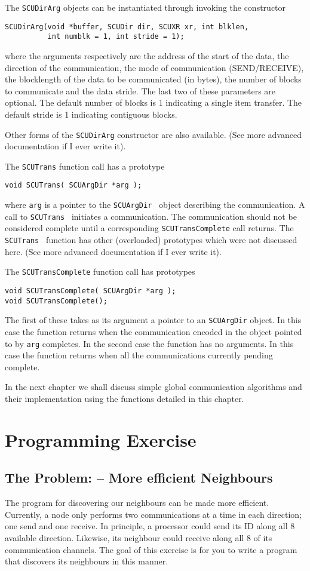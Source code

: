 The {\tt SCUDirArg} objects can be instantiated through invoking the 
constructor
\begin{verbatim}
SCUDirArg(void *buffer, SCUDir dir, SCUXR xr, int blklen, 
          int numblk = 1, int stride = 1);
\end{verbatim} 
where the arguments respectively are the address of the start of the
data, the direction of the communication, the mode of communication
(SEND/RECEIVE), the blocklength of the data to be communicated (in
bytes), the number of blocks to communicate and the data stride. The
last two of these parameters are optional. The default number of blocks
is 1 indicating a single item transfer. The default stride is 1 indicating
contiguous blocks.

Other forms of the {\tt SCUDirArg} constructor are also available.
(See more advanced documentation if I ever write it).

The {\tt SCUTrans} function call has a prototype
\begin{verbatim}
void SCUTrans( SCUArgDir *arg );
\end{verbatim}
where {\tt arg} is a pointer to the {\tt SCUArgDir } object describing
the communication. A call to {\tt SCUTrans } initiates a communication.
The communication should not be considered complete until a corresponding
{\tt SCUTransComplete} call returns. The {\tt SCUTrans } function has
other (overloaded) prototypes which were not discussed here. (See more
advanced documentation if I ever write it).

The {\tt SCUTransComplete} function call has prototypes
\begin{verbatim}
void SCUTransComplete( SCUArgDir *arg );
void SCUTransComplete();
\end{verbatim}
The first of these takes as its argument a pointer to an {\tt SCUArgDir} object.
In this case the function returns when the communication encoded in the
object pointed to by {\tt arg} completes. In the second case the function
has no arguments. In this case the function returns when all the 
communications currently pending complete.

In the next chapter we shall discuss simple global communication algorithms
and their implementation using the functions detailed in this chapter.

\section{Programming Exercise}
\subsection{The Problem: -- More efficient Neighbours}
The program for discovering our neighbours can be made more efficient. Currently, a node only performs two communications at a time in each direction; one send and one receive. In principle, a processor could send its ID along all 8
available direction. Likewise, its neighbour could receive along all 8 of its
communication channels. The goal of this exercise is for you to write a
program that discovers its neighbours in this manner.

